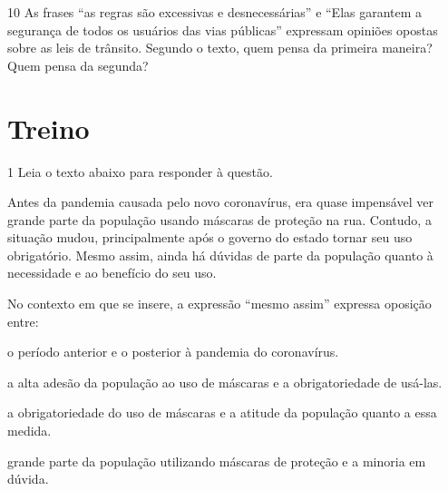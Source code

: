 
\num{10} As frases ``as regras são excessivas e desnecessárias'' e 
``Elas garantem a segurança de todos os usuários das vias públicas'' expressam
opiniões opostas sobre as leis de trânsito. Segundo o texto, quem pensa
da primeira maneira? Quem pensa da segunda?


\section*{Treino}

\num{1} Leia o texto abaixo para responder à questão.

\begin{myquote}

Antes da pandemia causada pelo novo coronavírus, era quase impensável
ver grande parte da população usando máscaras de proteção na rua.
Contudo, a situação mudou, principalmente após o governo do estado tornar
seu uso obrigatório. Mesmo assim, ainda há dúvidas de parte da população
quanto à necessidade e ao benefício do seu uso.


\end{myquote}

No contexto em que se insere, a expressão ``mesmo assim'' expressa oposição entre:

\begin{escolha}

  \item o período anterior e o posterior à pandemia do coronavírus.

  \item a alta adesão da população ao uso de máscaras e a obrigatoriedade de usá-las.

  \item a obrigatoriedade do uso de máscaras e a atitude da população quanto a essa medida.

  \item grande parte da população utilizando máscaras de proteção e a minoria em dúvida.

\end{escolha}

